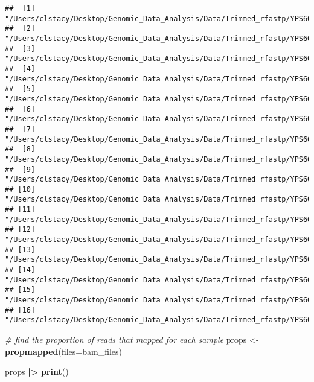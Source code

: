 \documentclass[
]{book}
\newenvironment{Shaded}{\begin{snugshade}}{\end{snugshade}}
\newcommand{\AttributeTok}[1]{\textcolor[rgb]{0.13,0.29,0.53}{#1}}
\newcommand{\CommentTok}[1]{\textcolor[rgb]{0.56,0.35,0.01}{\textit{#1}}}
\newcommand{\FunctionTok}[1]{\textcolor[rgb]{0.13,0.29,0.53}{\textbf{#1}}}
\newcommand{\NormalTok}[1]{#1}
\newcommand{\OtherTok}[1]{\textcolor[rgb]{0.56,0.35,0.01}{#1}}
\newcommand{\SpecialCharTok}[1]{\textcolor[rgb]{0.81,0.36,0.00}{\textbf{#1}}}
\begin{document}
\begin{verbatim}
##  [1] "/Users/clstacy/Desktop/Genomic_Data_Analysis/Data/Trimmed_rfastp/YPS606_MSN24_ETOH_REP1_R1.fastq.gz.subread.BAM"
##  [2] "/Users/clstacy/Desktop/Genomic_Data_Analysis/Data/Trimmed_rfastp/YPS606_MSN24_ETOH_REP2_R1.fastq.gz.subread.BAM"
##  [3] "/Users/clstacy/Desktop/Genomic_Data_Analysis/Data/Trimmed_rfastp/YPS606_MSN24_ETOH_REP3_R1.fastq.gz.subread.BAM"
##  [4] "/Users/clstacy/Desktop/Genomic_Data_Analysis/Data/Trimmed_rfastp/YPS606_MSN24_ETOH_REP4_R1.fastq.gz.subread.BAM"
##  [5] "/Users/clstacy/Desktop/Genomic_Data_Analysis/Data/Trimmed_rfastp/YPS606_MSN24_MOCK_REP1_R1.fastq.gz.subread.BAM"
##  [6] "/Users/clstacy/Desktop/Genomic_Data_Analysis/Data/Trimmed_rfastp/YPS606_MSN24_MOCK_REP2_R1.fastq.gz.subread.BAM"
##  [7] "/Users/clstacy/Desktop/Genomic_Data_Analysis/Data/Trimmed_rfastp/YPS606_MSN24_MOCK_REP3_R1.fastq.gz.subread.BAM"
##  [8] "/Users/clstacy/Desktop/Genomic_Data_Analysis/Data/Trimmed_rfastp/YPS606_MSN24_MOCK_REP4_R1.fastq.gz.subread.BAM"
##  [9] "/Users/clstacy/Desktop/Genomic_Data_Analysis/Data/Trimmed_rfastp/YPS606_WT_ETOH_REP1_R1.fastq.gz.subread.BAM"   
## [10] "/Users/clstacy/Desktop/Genomic_Data_Analysis/Data/Trimmed_rfastp/YPS606_WT_ETOH_REP2_R1.fastq.gz.subread.BAM"   
## [11] "/Users/clstacy/Desktop/Genomic_Data_Analysis/Data/Trimmed_rfastp/YPS606_WT_ETOH_REP3_R1.fastq.gz.subread.BAM"   
## [12] "/Users/clstacy/Desktop/Genomic_Data_Analysis/Data/Trimmed_rfastp/YPS606_WT_ETOH_REP4_R1.fastq.gz.subread.BAM"   
## [13] "/Users/clstacy/Desktop/Genomic_Data_Analysis/Data/Trimmed_rfastp/YPS606_WT_MOCK_REP1_R1.fastq.gz.subread.BAM"   
## [14] "/Users/clstacy/Desktop/Genomic_Data_Analysis/Data/Trimmed_rfastp/YPS606_WT_MOCK_REP2_R1.fastq.gz.subread.BAM"   
## [15] "/Users/clstacy/Desktop/Genomic_Data_Analysis/Data/Trimmed_rfastp/YPS606_WT_MOCK_REP3_R1.fastq.gz.subread.BAM"   
## [16] "/Users/clstacy/Desktop/Genomic_Data_Analysis/Data/Trimmed_rfastp/YPS606_WT_MOCK_REP4_R1.fastq.gz.subread.BAM"
\end{verbatim}

\begin{Shaded}
\begin{Highlighting}[]
\CommentTok{\# find the proportion of reads that mapped for each sample}
\NormalTok{props }\OtherTok{\textless{}{-}} \FunctionTok{propmapped}\NormalTok{(}\AttributeTok{files=}\NormalTok{bam\_files)}

\NormalTok{props }\SpecialCharTok{|\textgreater{}} \FunctionTok{print}\NormalTok{()}
\end{Highlighting}
\end{Shaded}
\end{document}
